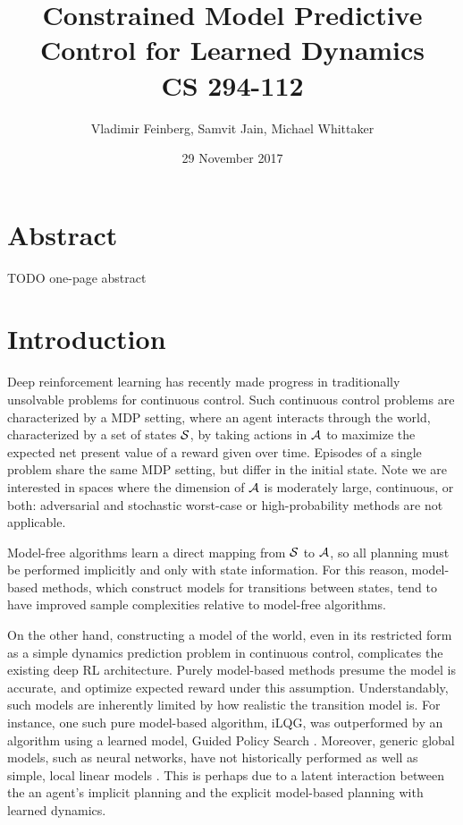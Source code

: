 \documentclass{article}
\title{Constrained Model Predictive Control for Learned Dynamics\\\large CS 294-112}
\author{Vladimir Feinberg, Samvit Jain, Michael Whittaker}
\date{29 November 2017}
\let\Oldsection\section
\renewcommand{\section}{\FloatBarrier\Oldsection}
\begin{document}
	
\maketitle

\section{Abstract}

TODO one-page abstract

\section{Introduction}

Deep reinforcement learning has recently made progress in traditionally unsolvable problems for continuous control. Such continuous control problems are characterized by a MDP setting, where an agent interacts through the world, characterized by a set of states $\mathcal{S}$, by taking actions in $\mathcal{A}$ to maximize the expected net present value of a reward given over time. Episodes of a single problem share the same MDP setting, but differ in the initial state. Note we are interested in spaces where the dimension of $\mathcal{A}$ is moderately large, continuous, or both: adversarial and stochastic worst-case or high-probability methods are not applicable.

Model-free algorithms learn a direct mapping from $\mathcal{S}$ to $\mathcal{A}$, so all planning must be performed implicitly and only with state information. For this reason, model-based methods, which construct models for transitions between states, tend to have improved sample complexities relative to model-free algorithms.

On the other hand, constructing a model of the world, even in its restricted form as a simple dynamics prediction problem in continuous control, complicates the existing deep RL architecture. Purely model-based methods presume the model is accurate, and optimize expected reward under this assumption. Understandably, such models are inherently limited by how realistic the transition model is. For instance, one such pure model-based algorithm, iLQG, was outperformed by an algorithm using a learned model, Guided Policy Search \cite{levine2014learning}. Moreover, generic global models, such as neural networks, have not historically performed as well as simple, local linear models \cite{gu2016continuous}. This is perhaps due to a latent interaction between the an agent's implicit planning and the explicit model-based planning with learned dynamics.
\end{document}
